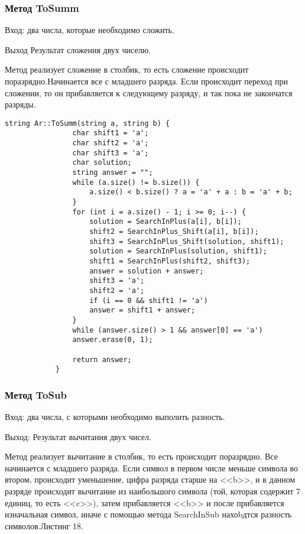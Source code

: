\documentclass[10pt,a4paper,final]{article} %
\begin{document}
			\subsubsection{Метод ToSumm}
			Вход: два числа, которые необходимо сложить.
			
			Выход Результат сложения двух чиселю.
			
			Метод реализует сложение в столбик, то есть сложение происходит поразрядно.Начинается все с младшего разряда. Если происходит переход при сложении, то он прибавляется к следующему разряду, и так пока не закончатся разряды.
		
		\begin{lstlisting}[caption={Метод ToSumm}]
			string Ar::ToSumm(string a, string b) {
				char shift1 = 'a';
				char shift2 = 'a';
				char shift3 = 'a';
				char solution;
				string answer = "";
				while (a.size() != b.size()) {
					a.size() < b.size() ? a = 'a' + a : b = 'a' + b;
				}
				for (int i = a.size() - 1; i >= 0; i--) {
					solution = SearchInPlus(a[i], b[i]);
					shift2 = SearchInPlus_Shift(a[i], b[i]);
					shift3 = SearchInPlus_Shift(solution, shift1);
					solution = SearchInPlus(solution, shift1);
					shift1 = SearchInPlus(shift2, shift3);
					answer = solution + answer;
					shift3 = 'a';
					shift2 = 'a';
					if (i == 0 && shift1 != 'a')
					answer = shift1 + answer;
				}
				while (answer.size() > 1 && answer[0] == 'a')
				answer.erase(0, 1);
				
				return answer;
			}
		\end{lstlisting}
		
		
			\subsubsection{Метод ToSub}
			Вход: два числа, с которыми необходимо выполить разность.

	Выход: Результат вычитания двух чисел.
	
	Метод реализует вычитание в столбик, то есть происходит поразрядно. Все начинается с младшего разряда. Если символ в первом числе меньше символа во втором, происходит уменьшение, цифра разряда старше на <<b>>, и в данном разряде происходит вычитание из наибольшого символа (той, которая содержит 7 единиц, то есть <<c>>), затем прибавляется <<b>> и после прибавляется изначальная символ, иначе с помощью метода SearchInSub нахоbдтся разность символов.Листинг 18. 
	
\end{document}
